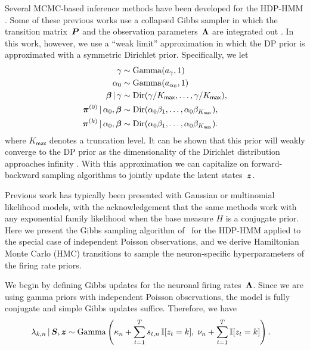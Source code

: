 Several MCMC-based inference methods have been developed for the
HDP-HMM \citep{Teh06,van08}. Some of these previous works use a
collapsed Gibbs sampler in which the transition matrix~$\boldsymbol{P}$ and the
observation parameters~$\boldsymbol{\Lambda}$ are integrated out
\citep{Teh06,van08}. In this work, however, we use a ``weak limit''
approximation in which the DP prior is approximated with a symmetric
Dirichlet prior. Specifically, we let
\begin{align}
\label{eq:hdphmm_trans}
\gamma &\sim \mathrm{Gamma}(a_\gamma, 1) \\
\nonumber \alpha_0 &\sim \mathrm{Gamma}(a_{\alpha_0}, 1) \\
\nonumber \boldsymbol{\beta} \,|\, \gamma &\sim \mathrm{Dir}(\gamma/K_{\mathsf{max}}, \ldots, \gamma/K_{\mathsf{max}}), \\
\nonumber \boldsymbol{\pi}^{(0)} \,|\, \alpha_0, \boldsymbol{\beta} &\sim \mathrm{Dir}(\alpha_0 \beta_1, \ldots, \alpha_0 \beta_{K_{\mathsf{max}}}), \\
\nonumber \boldsymbol{\pi}^{(k)} \,|\, \alpha_0, \boldsymbol{\beta} &\sim \mathrm{Dir}(\alpha_0 \beta_1, \ldots, \alpha_0 \beta_{K_{\mathsf{max}}}).
\end{align}
where $K_{\mathsf{max}}$ denotes a truncation level.  It can be
shown that this prior will weakly converge to the DP prior as the
dimensionality of the Dirichlet distribution approaches infinity
\citep{Johnson14, Ishwaran02}. With this approximation we can
capitalize on forward-backward sampling algorithms to jointly update
the latent states~$\boldsymbol{z}$.

Previous work has typically been presented with Gaussian or
multinomial likelihood models, with the acknowledgement that the same
methods work with any exponential family likelihood when the base
measure $H$ is a conjugate prior.  Here we present the Gibbs sampling
algorithm of~\citep{Teh06} for the HDP-HMM applied to the special case
of independent Poisson observations, and we derive Hamiltonian Monte
Carlo (HMC)  \citep{Neal10} transitions to sample the neuron-specific hyperparameters of
the firing rate priors.

We begin by defining Gibbs updates for the neuronal firing
rates~$\boldsymbol{\Lambda}$. Since we are using gamma priors with independent
Poisson observations, the model is fully conjugate and simple Gibbs
updates suffice. Therefore, we have
\begin{align*}
\lambda_{k,n} \,|\, \boldsymbol{S}, \boldsymbol{z} 
  &\sim \mathrm{Gamma} \left(
    \kappa_n + \sum_{t=1}^T s_{t,n} \, \mathbb{I}[z_t=k], \; 
    \nu_n + \sum_{t=1}^T \mathbb{I}[z_t=k]
    \right).
\end{align*}


